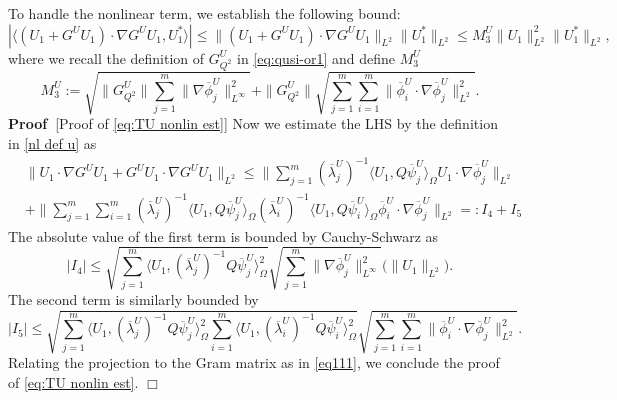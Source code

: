 \documentclass[11pt,a4paper]{article}
\numberwithin{equation}{section}
\newcommand{\assign}{:=}
\newcommand{\backassign}{=:}
\newcommand{\cdummy}{\cdot}
\newenvironment{proof}{\noindent\textbf{Proof\ }}{\hspace*{\fill}$\Box$\medskip}
\begin{document}
To handle the nonlinear term, we establish the following bound:
\begin{equation}
  | \langle (U_1 + G^{U} U_1) \cdot \nabla G^{U} U_1, U_1^{\ast} \rangle |\leqslant\|(U_1 + G^{U} U_1) \cdot \nabla G^{U} U_1\|_{L^2}\|U_1^{\ast}\|_{L^2}
  \leqslant M_3^U \|  U_1 \|_{L^2}^2\| U_1^{\ast} \|_{L^2}  ,
  \label{eq:TU nonlin est}
\end{equation}
where we recall the definition of $G^U_{Q^2}$ in \eqref{eq:qusi-or1} and define $M^U_3$
\[M^U_3\assign\sqrt{\|G^U_{Q^2}\|\sum_{j = 1}^m \| \nabla \overline\phi_j ^U\|_{L^\infty}^2} + \|G^U_{Q^2}\|\sqrt{\sum_{j = 1}^m\sum_{i = 1}^m \| \overline\phi_i^U \cdummy \nabla \overline\phi_j^U
  \|_{L^2}^2}.\]
\begin{proof}[Proof of \eqref{eq:TU nonlin est}]
  Now we estimate the LHS by the definition in \eqref{nl def u} as
  \begin{align*}
    &\|U_1 \cdummy \nabla G^{U} U_1 + G^{U} U_1 \cdummy \nabla G^{U} U_1 \|_{L^2}\leqslant
     \|\sum_{j = 1}^m (\overline{\lambda}_j^U)^{-1} \langle U_1, Q\overline\psi_j^U \rangle_{\Omega}  U_1
    \cdummy \nabla \overline\phi_j^U \|_{L^2}\\
    &+ \|\sum_{j = 1}^m \sum_{i = 1}^m (\overline{\lambda}_j^U)^{-1} \langle U_1, Q\overline\psi_j^U \rangle_{\Omega}(\overline{\lambda}_i^U)^{-1} \langle U_1, Q\overline\psi_i^U \rangle_{\Omega}  \overline\phi_i ^U\cdummy
    \nabla \overline\phi_j^U\|_{L^2}\backassign I_4+I_5
  \end{align*}
  The absolute value of the first term is bounded by Cauchy-Schwarz as
  \[|I_4|\leqslant
    \sqrt{\sum_{j = 1}^m  \langle U_1, (\overline{\lambda}_j^U)^{-1}Q\overline\psi_j^U \rangle_{\Omega}^2}
    \sqrt{\sum_{j = 1}^m \| \nabla \overline\phi_j ^U\|_{L^\infty}^2} \bigg(\| U_1 \|_{L^2}\bigg) .
\]
  The second term is similarly bounded by
  \[ |I_5|\leqslant\sqrt{\sum_{j = 1}^m   \langle U_1, (\overline{\lambda}_j^U)^{-1}Q\overline\psi_j^U \rangle_{\Omega}^2 \sum_{i = 1}^m \langle U_1, (\overline{\lambda}_i^U)^{-1}Q\overline\psi_i^U \rangle_{\Omega}^2}    \sqrt{\sum_{j = 1}^m
     \sum_{i = 1}^m \| \overline\phi_i^U \cdummy \nabla \overline\phi_j^U \|_{L^2}^2} 
     . \]
Relating the projection to the Gram matrix as in \eqref{eq111}, we conclude the proof of \eqref{eq:TU nonlin est}.
     \end{proof}
     
\end{document}
